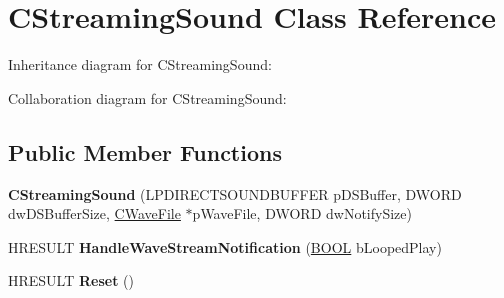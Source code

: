 \hypertarget{class_c_streaming_sound}{\section{C\+Streaming\+Sound Class Reference}
\label{class_c_streaming_sound}
}


Inheritance diagram for C\+Streaming\+Sound\+:


Collaboration diagram for C\+Streaming\+Sound\+:
\subsection*{Public Member Functions}
\begin{DoxyCompactItemize}
\item 
\hypertarget{class_c_streaming_sound_a7fa3961eff8e78fdb5dd8c6740f472df}{{\bfseries C\+Streaming\+Sound} (L\+P\+D\+I\+R\+E\+C\+T\+S\+O\+U\+N\+D\+B\+U\+F\+F\+E\+R p\+D\+S\+Buffer, D\+W\+O\+R\+D dw\+D\+S\+Buffer\+Size, \hyperlink{class_c_wave_file}{C\+Wave\+File} $\ast$p\+Wave\+File, D\+W\+O\+R\+D dw\+Notify\+Size)}\label{class_c_streaming_sound_a7fa3961eff8e78fdb5dd8c6740f472df}

\item 
\hypertarget{class_c_streaming_sound_a86f319f40957fb309f9e5eda99186a75}{H\+R\+E\+S\+U\+L\+T {\bfseries Handle\+Wave\+Stream\+Notification} (\hyperlink{_ice_types_8h_a050c65e107f0c828f856a231f4b4e788}{B\+O\+O\+L} b\+Looped\+Play)}\label{class_c_streaming_sound_a86f319f40957fb309f9e5eda99186a75}

\item 
\hypertarget{class_c_streaming_sound_a566d5512e22de66e7cfbab17784335cf}{H\+R\+E\+S\+U\+L\+T {\bfseries Reset} ()}\label{class_c_streaming_sound_a566d5512e22de66e7cfbab17784335cf}

\end{DoxyCompactItemize}
